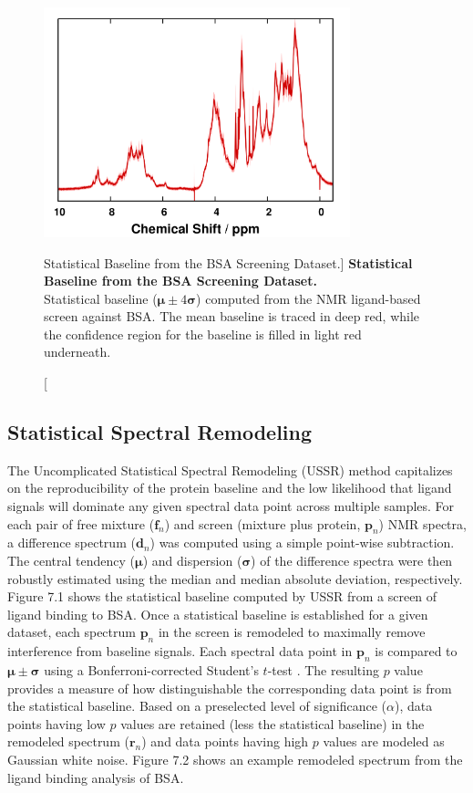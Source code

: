 \begin{figure}
\includegraphics[width=3.5in]{figs/ussr/01-baseline.png}
\caption
      [Statistical Baseline from the BSA Screening Dataset.]{
  {\bf Statistical Baseline from the BSA Screening Dataset.}
  \\
  Statistical baseline ($\boldsymbol{\mu} \pm 4 \boldsymbol{\sigma}$) computed
  from the \hnmr{} NMR ligand-based screen against BSA. The mean baseline is
  traced in deep red, while the confidence region for the baseline is filled
  in light red underneath.
}
\end{figure}

\subsection{Statistical Spectral Remodeling}

\begin{doublespace}
The Uncomplicated Statistical Spectral Remodeling (USSR) method capitalizes on
the reproducibility of the protein baseline and the low likelihood that ligand
signals will dominate any given spectral data point across multiple samples.
For each pair of free mixture ($\mathbf{f}_n$) and screen (mixture plus
protein, $\mathbf{p}_n$) \hnmr{} NMR spectra, a difference spectrum
($\mathbf{d}_n$) was computed using a simple point-wise subtraction. The
central tendency ($\boldsymbol{\mu}$) and dispersion ($\boldsymbol{\sigma}$)
of the difference spectra were then robustly estimated using the median and
median absolute deviation, respectively. Figure 7.1 shows the statistical
baseline computed by USSR from a screen of ligand binding to BSA. Once a
statistical baseline is established for a given dataset, each spectrum
$\mathbf{p}_n$ in the screen is remodeled to maximally remove interference
from baseline signals. Each spectral data point in $\mathbf{p}_n$ is compared
to $\boldsymbol{\mu} \pm \boldsymbol{\sigma}$ using a Bonferroni-corrected
Student's $t$-test \cite{dunn:jasa1961}. The resulting $p$ value provides a
measure of how distinguishable the corresponding data point is from the
statistical baseline. Based on a preselected level of significance ($\alpha$),
data points having low $p$ values are retained (less the statistical baseline)
in the remodeled spectrum ($\mathbf{r}_n$) and data points having high $p$
values are modeled as Gaussian white noise. Figure 7.2 shows an example
remodeled spectrum from the ligand binding analysis of BSA.
\end{doublespace}


